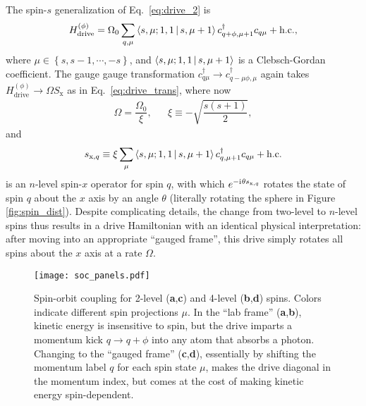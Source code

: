 \documentclass[nofootinbib,twocolumn]{revtex4-2}
\renewcommand{\t}{\text} %
\newcommand{\f}[2]{\dfrac{#1}{#2}} %
\renewcommand{\set}[1]{\left\{#1\right\}} %
\newcommand{\bk}{\Braket} %
\renewcommand{\i}{\mathrm{i}\mkern1mu} %
\newcommand{\1}{\mathds{1}}
\newcommand{\x}{\text{x}}
\begin{document}
The spin-$s$ generalization of Eq.~\eqref{eq:drive_2} is
\begin{align}
  H_{\t{drive}}^{(\phi)} = \Omega_0 \sum_{q,\mu} \bk{s,\mu;1,1|s,\mu+1}
  c_{q+\phi,\mu+1}^\dag c_{q\mu} + \t{h.c.},
\end{align}
where $\mu\in\set{s,s-1,\cdots,-s}$, and $\bk{s,\mu;1,1|s,\mu+1}$ is a Clebsch-Gordan coefficient.
The gauge gauge transformation $c_{q\mu}^\dag\to c_{q-\mu\phi,\mu}^\dag$ again takes $H_{\t{drive}}^{(\phi)}\to \Omega S_\x$ as in Eq.~\eqref{eq:drive_trans}, where now
\begin{align}
  \Omega = \f{\Omega_0}{\xi},
  &&
  \xi \equiv -\sqrt{\f{s(s+1)}{2}},
\end{align}
and
\begin{align}
  s_{\x,q} \equiv \xi \sum_\mu \bk{s,\mu;1,1|s,\mu+1} c_{q,\mu+1}^\dag c_{q\mu} + \t{h.c.}
  \label{eq:spin_x_op}
\end{align}
is an $n$-level spin-$x$ operator for spin $q$, with which $e^{-\i\theta s_{\x,q}}$ rotates the state of spin $q$ about the $x$ axis by an angle $\theta$ (literally rotating the sphere in Figure \ref{fig:spin_dist}).
Despite complicating details, the change from two-level to $n$-level spins thus results in a drive Hamiltonian with an identical physical interpretation: after moving into an appropriate ``gauged frame'', this drive simply rotates all spins about the $x$ axis at a rate $\Omega$.

\begin{figure}
\centering
\texttt{[image: soc\_panels.pdf]}
\caption{
Spin-orbit coupling for 2-level ({\bf a},{\bf c}) and 4-level ({\bf b},{\bf d}) spins.
Colors indicate different spin projections $\mu$.
In the ``lab frame'' ({\bf a},{\bf b}), kinetic energy is insensitive to spin, but the drive imparts a momentum kick $q\to q+\phi$ into any atom that absorbs a photon.
Changing to the ``gauged frame'' ({\bf c},{\bf d}), essentially by shifting the momentum label $q$ for each spin state $\mu$, makes the drive diagonal in the momentum index, but comes at the cost of making kinetic energy spin-dependent.
}
\label{fig:soc_panels}
\end{figure}
\end{document}
